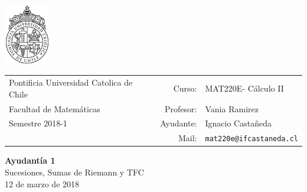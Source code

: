\documentclass[12pt]{article}
\makeatletter
\newcommand{\ayudantia}{{\sc Ayudantía 1}}
\newcommand{\tituloayu}{Sucesiones, Sumas de Riemann y TFC}
\newcommand{\fecha}{12 de marzo de 2018}
\newcommand{\sigla}{MAT220E}
\newcommand{\nombre}{Cálculo II}
\newcommand{\profesor}{Vania Ramirez}
\newcommand{\ano}{2018}
\newcommand{\semestre}{1}
\newcommand{\mail}{mat220e@ifcastaneda.cl}
\makeatother
\begin{document}
\thispagestyle{empty}

\begin{minipage}{2cm}
	\includegraphics[width=2cm]{../../../../img/logo.pdf}
	\vspace{0.5cm}
\end{minipage}
\begin{minipage}{\linewidth}
	\begin{tabular}{lrl}
		{\scriptsize\sc Pontificia Universidad Catolica de Chile} & \hspace*{0.7in}Curso: &
		\sigla  - \nombre\\
		{\sc Facultad de Matemáticas}&
		Profesor: & \profesor \\
		{\sc Semestre \ano-\semestre} & Ayudante: & {Ignacio Castañeda}\\
		& {Mail:} & \texttt{\mail}
	\end{tabular}
\end{minipage}

\vspace{-10mm}
\begin{center}
	{\LARGE\bf \ayudantia}\\
	\vspace{0.1cm}
	{\tituloayu}\\
	\vspace{0.1cm}
	\fecha\\
	\vspace{0.4cm}
\end{center}
\end{document}
